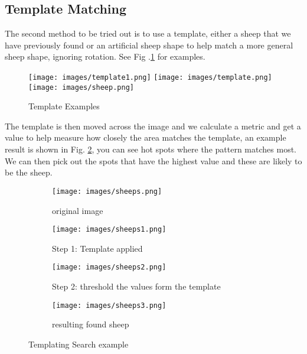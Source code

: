 \subsection{Template Matching}

The second method to be tried out is to use a template, either a sheep that we have previously found or an artificial sheep shape to help match a more general sheep shape, ignoring rotation. See Fig .\ref{templates} for examples.
    
    \begin{figure}[H]
        \texttt{[image: images/template1.png]}
        \texttt{[image: images/template.png]}
        \texttt{[image: images/sheep.png]}
        \caption{Template Examples}
        \label{templates}
    \end{figure}
    
    The template is then moved across the image and we calculate a metric and get a value to help measure how closely the area matches the template, an example result is shown in Fig. \ref{sheeps}, you can see hot spots where the pattern matches most. We can then pick out the spots that have the highest value and these are likely to be the sheep.
    
    \begin{figure}[H]
        \begin{subfigure}{.5\textwidth}
        \centering
        \texttt{[image: images/sheeps.png]}
        \caption{original image}
    \end{subfigure}%
    \begin{subfigure}{.5\textwidth}
        \centering
        \texttt{[image: images/sheeps1.png]}
        \caption{Step 1: Template applied}
    \end{subfigure}
    \begin{subfigure}{.5\textwidth}
        \centering
        \texttt{[image: images/sheeps2.png]}
        \caption{Step 2: threshold the values form the template}
    \end{subfigure}%
    \begin{subfigure}{.5\textwidth}
        \centering
        \texttt{[image: images/sheeps3.png]}
        \caption{resulting found sheep}
    \end{subfigure}
        \caption{Templating Search example}
        \label{sheeps}
    \end{figure}
    
